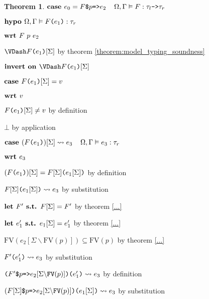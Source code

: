 \documentclass[acmsmall]{acmart}
\theoremstyle{definition}
\newtheorem{theorem}{Theorem}[section]
\begin{document}
\begin{theorem}
    \item \Z $\textbf{case }
      e_0 = \texttt{$F$\$$p$=>$e_2$}
      \hspace{4mm}
      \Omega, \Gamma \vDash F : \texttt{$\tau_l$->$\tau_r$}
    $ 
    \item \Z $\textbf{hypo }
      \Omega, \Gamma \vDash \texttt{$F$($e_1$)} : \tau_r
    $
    \item \Z $\textbf{wrt }
      F\ p\ e_2 
    $
      \item \Z\Z $\VDash \code{$F$($e_1$)}[\Sigma] $
      by theorem \ref{theorem:model_typing_soundness}
      \item \Z\Z $\B{invert on } \VDash \code{$F$($e_1$)}[\Sigma]$
      \item \Z\Z $\textbf{case } \texttt{$F$($e_1$)}[\Sigma] = v$
      \item \Z\Z $\textbf{wrt } v$
        \item \Z\Z\Z $\texttt{$F$($e_1$)}[\Sigma] \neq v$ by definition 
        \item \Z\Z\Z $\bot$ by application
      \item \Z\Z $\textbf{case } 
        (\texttt{$F$($e_1$)})[\Sigma] \rightsquigarrow e_3
        \hspace{4mm}
        \Omega, \Gamma \vDash e_3 : \tau_r
      $
      \item \Z\Z $\textbf{wrt } e_3$
        \item \Z\Z\Z $(\texttt{$F$($e_1$)})[\Sigma] = \texttt{$F[\Sigma]$($e_1[\Sigma]$)}$ by definition
        \item \Z\Z\Z $\texttt{$F[\Sigma]$($e_1[\Sigma]$)} \rightsquigarrow e_3$ by substitution 

        \item \Z\Z\Z $\textbf{let } F' \textbf{ s.t. } F[\Sigma] = F'$ by theorem \ref{...} 
        \item \Z\Z\Z $\textbf{let } e_1' \textbf{ s.t. } e_1[\Sigma] = e_1'$ by theorem \ref{...} 

        \item \Z\Z\Z $\text{FV}(e_2[\Sigma\backslash\text{FV}(p)]) \subseteq \text{FV}(p)$ 
        by theorem \ref{...} 

        \item \Z\Z\Z $\texttt{$F'$($e_1'$)} \rightsquigarrow e_3$ by substitution 
        \item \Z\Z\Z $\texttt{($F'$\$$p$=>$e_2[\Sigma\backslash\text{FV}(p)]$)($e_1'$)} \rightsquigarrow e_3$ by definition 
        \item \Z\Z\Z $(\texttt{$F[\Sigma]$\$$p$=>$e_2[\Sigma\backslash\text{FV}(p)]$)($e_1[\Sigma]$)} \rightsquigarrow e_3$ by substitution 


\end{theorem}
\end{document}
